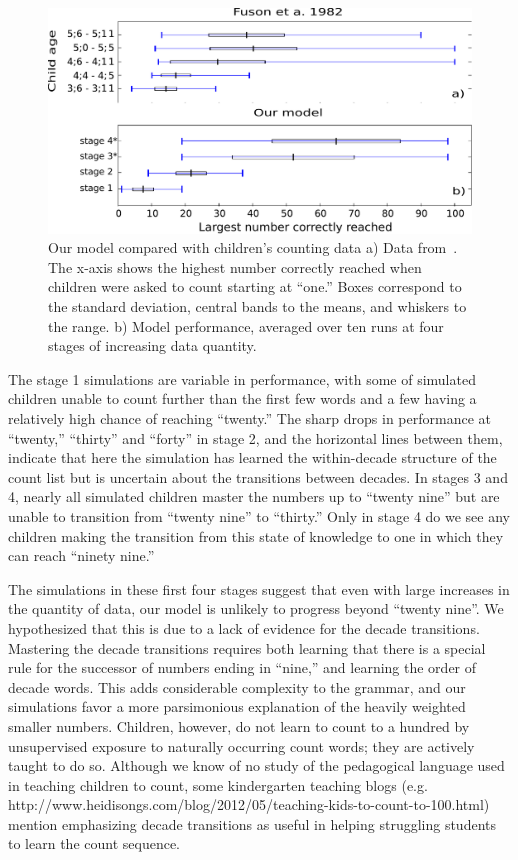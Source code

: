 \documentclass[10pt,letterpaper]{article}
\begin{document}
\begin{figure}[t]
  \includegraphics[width=0.9\linewidth]{figures/modelboxplot.pdf}
  \caption{Our model compared with children's counting data a) Data
    from~\citet{FusRicBriar1982}. The x-axis shows the highest number
    correctly reached when children were asked to count starting at
    ``one.'' Boxes correspond to the standard deviation, central bands
    to the means, and whiskers to the range. b) Model performance,
    averaged over ten runs at four stages of increasing data
    quantity.}\label{fig:fuson_model_comparison}
\end{figure}


The stage 1 simulations are variable in performance, with some of
simulated children unable to count further than the first few words
and a few having a relatively high chance of reaching ``twenty.'' The
sharp drops in performance at ``twenty,'' ``thirty'' and ``forty'' in
stage 2, and the horizontal lines between them, indicate that here the
simulation has learned the within-decade structure of the count list
but is uncertain about the transitions between decades. In stages 3
and 4, nearly all simulated children master the numbers up to ``twenty
nine'' but are unable to transition from ``twenty nine'' to ``thirty.''
Only in stage 4 do we see any children making the transition from this
state of knowledge to one in which they can reach ``ninety nine.''

The simulations in these first four stages suggest that even with
large increases in the quantity of data, our model is unlikely to
progress beyond ``twenty nine''. We hypothesized that this is due to a
lack of evidence for the decade transitions. Mastering the decade
transitions requires both learning that there is a special rule for
the successor of numbers ending in ``nine,'' and learning the order of
decade words. This adds considerable complexity to the grammar, and
our simulations favor a more parsimonious explanation of the heavily
weighted smaller numbers. Children, however, do not learn to count to
a hundred by unsupervised exposure to naturally occurring count words;
they are actively taught to do so. Although we know of no study of the
pedagogical language used in teaching children to count, some
kindergarten teaching blogs (e.g.
http://www.heidisongs.com/blog/2012/05/teaching-kids-to-count-to-100.html)
mention emphasizing decade transitions as useful in helping struggling
students to learn the count sequence.
\end{document}
